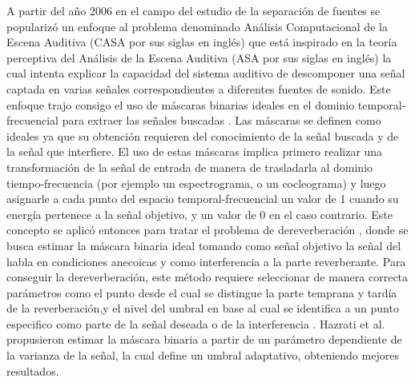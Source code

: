 A partir del año 2006 en el campo del estudio de la separación de fuentes se popularizó un enfoque al problema denominado Análisis Computacional de la Escena Auditiva (CASA por sus siglas en inglés)\cite{CASA} que está inspirado en la teoría perceptiva del Análisis de la Escena Auditiva (ASA por sus siglas en inglés)\cite{ASA} la cual intenta explicar la capacidad del sistema auditivo de descomponer una señal captada en varias señales correspondientes a diferentes fuentes de sonido. Este enfoque trajo consigo el uso de máscaras binarias ideales en el dominio temporal-frecuencial para extraer las señales buscadas \cite{binarymask}. Las máscaras se definen como ideales ya que su obtención requieren del conocimiento de la señal buscada y de la señal que interfiere. El uso de estas máscaras implica primero realizar una transformación de la señal de entrada de manera de trasladarla al dominio tiempo-frecuencia (por ejemplo un espectrograma, o un cocleograma) y luego asignarle a cada punto del espacio temporal-frecuencial un valor de 1 cuando su energía pertenece a la señal objetivo, y un valor de 0 en el caso contrario. Este concepto se aplicó entonces para tratar el problema de dereverberación \cite{rev_mask}, donde se busca estimar la máscara binaria ideal tomando como señal objetivo la señal del habla en condiciones anecoicas y como interferencia a la parte reverberante. Para conseguir la dereverberación, este método requiere seleccionar de manera correcta parámetros como el punto desde el cual se distingue la parte temprana y tardía de la reverberación,y el nivel del umbral en base al cual se identifica a un punto especifico como parte de la señal deseada o de la interferencia \cite{parametros}. Hazrati et al. \cite{hazrati} propusieron estimar la máscara binaria a partir de un parámetro dependiente de la varianza de la señal, la cual define un umbral adaptativo, obteniendo mejores resultados. 

